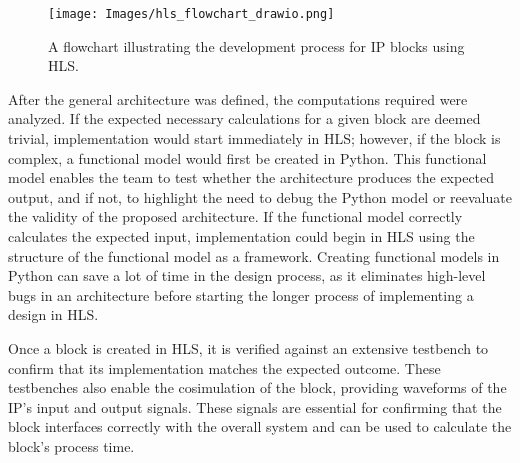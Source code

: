 \documentclass{article}
\begin{document}
            \begin{figure}[!tb] 
                \centering
                \texttt{[image: Images/hls\_flowchart\_drawio.png]} 
                \caption{A flowchart illustrating the development process for IP blocks using HLS.}
                \label{fig:hls_flowchart} 
            \end{figure}
        
        \par After the general architecture was defined, the computations required were analyzed. If the expected necessary calculations for a given block are deemed trivial, implementation would start immediately in HLS; however, if the block is complex, a functional model would first be created in Python. This functional model enables the team to test whether the architecture produces the expected output, and if not, to highlight the need to debug the Python model or reevaluate the validity of the proposed architecture. If the functional model correctly calculates the expected input, implementation could begin in HLS using the structure of the functional model as a framework. Creating functional models in Python can save a lot of time in the design process, as it eliminates high-level bugs in an architecture before starting the longer process of implementing a design in HLS. 
        \par Once a block is created in HLS, it is verified against an extensive testbench to confirm that its implementation matches the expected outcome. These testbenches also enable the cosimulation of the block, providing waveforms of the IP’s input and output signals. These signals are essential for confirming that the block interfaces correctly with the overall system and can be used to calculate the block's process time.

        
\end{document}
